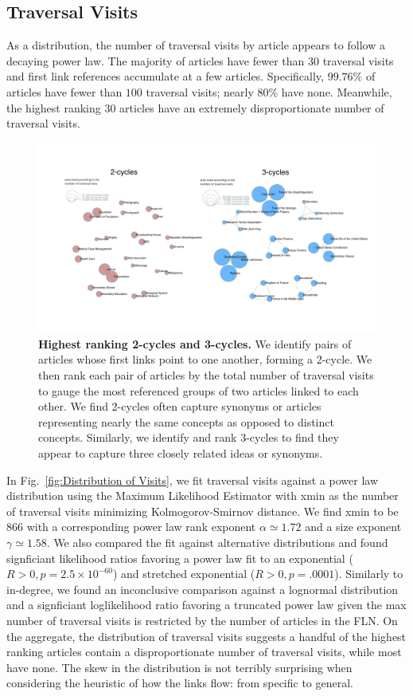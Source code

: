 \documentclass[pre,twocolumn,twoside,superscriptaddress,floatfix]{revtex4-1}
\begin{document}
{\subsection{Traversal Visits}

As a distribution, the number of traversal visits by article appears to follow a decaying power law. 
The majority of articles have fewer than 30 traversal visits and
first link references accumulate at a few articles.
Specifically, $99.76\%$ of articles have fewer than $100$ traversal visits; nearly $80\%$ have none. 
Meanwhile, the highest ranking 30 articles have an extremely disproportionate number of traversal visits.

\begin{figure}[tph!]
  \includegraphics[width=\textwidth]{2_and_3_cycles.pdf}
  \caption{
    \textbf{Highest ranking 2-cycles and 3-cycles.}
We identify pairs of articles whose first links point to one another, forming
a 2-cycle. We then rank each pair of articles by the total number of 
traversal visits to gauge the most referenced groups of two articles linked
to each other. We find 2-cycles often capture synonyms or articles representing nearly the 
same concepts as opposed to distinct concepts. Similarly, we identify and 
rank 3-cycles to find they appear to capture three closely related ideas or synonyms.}
  \label{fig:cycles}
\end{figure}
In Fig.~\ref{fig:Distribution of Visits}, we fit traversal visits against a power law distribution using the Maximum Likelihood Estimator with xmin as the number of traversal visits minimizing Kolmogorov-Smirnov distance. We find xmin to be 866 with a corresponding power law rank exponent $\alpha \simeq 1.72$ and a size exponent $\gamma \simeq 1.58$.
We also compared the fit against alternative distributions and found signficiant likelihood ratios favoring a power law fit to an exponential ($R>0, p=2.5\times10^{-60}$) and stretched exponential ($R > 0, p=.0001$).
Similarly to in-degree, we found an inconclusive comparison against a lognormal distribution and a signficiant loglikelihood ratio favoring a truncated power law given the max number of traversal visits is restricted by the number of articles in the FLN. 
On the aggregate, the distribution of traversal visits suggests
a handful of the highest ranking articles contain a disproportionate number of traversal visits, while most have none. The skew in the distribution is not terribly surprising when considering the heuristic of how the links flow: from specific to general. 

}
\end{document}
